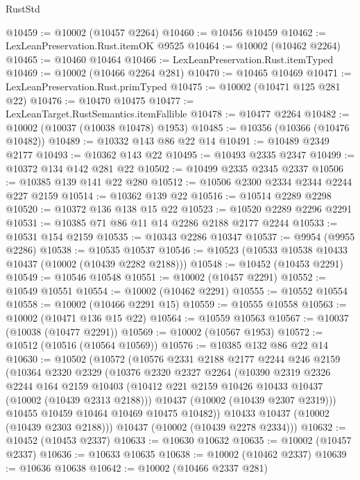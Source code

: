 \begin{lexlean}{RustStd}
\begin{coremodule}
@10459 := @10002 (@10457 @2264)
@10460 := @10456 @10459
@10462 := LexLeanPreservation.Rust.itemOK @9525
@10464 := @10002 (@10462 @2264)
@10465 := @10460 @10464
@10466 := LexLeanPreservation.Rust.itemTyped
@10469 := @10002 (@10466 @2264 @281)
@10470 := @10465 @10469
@10471 := LexLeanPreservation.Rust.primTyped
@10475 := @10002 (@10471 @125 @281 @22)
@10476 := @10470 @10475
@10477 := LexLeanTarget.RustSemantics.itemFallible
@10478 := @10477 @2264
@10482 := @10002 (@10037 (@10038 @10478) @1953)
@10485 := @10356 (@10366 (@10476 @10482))
@10489 := @10332 @143 @86 @22 @14
@10491 := @10489 @2349 @2177
@10493 := @10362 @143 @22
@10495 := @10493 @2335 @2347
@10499 := @10372 @134 @142 @281 @22
@10502 := @10499 @2335 @2345 @2337
@10506 := @10385 @139 @141 @22 @280
@10512 := @10506 @2300 @2334 @2344 @2244 @227 @2159
@10514 := @10362 @139 @22
@10516 := @10514 @2289 @2298
@10520 := @10372 @136 @138 @15 @22
@10523 := @10520 @2289 @2296 @2291
@10531 := @10385 @71 @86 @11 @14 @2286 @2188 @2177 @2244
@10533 := @10531 @154 @2159
@10535 := @10343 @2286 @10347
@10537 := @9954 (@9955 @2286)
@10538 := @10535 @10537
@10546 := @10523 (@10533 @10538 @10433 @10437 (@10002 (@10439 @2282 @2188)))
@10548 := @10452 (@10453 @2291)
@10549 := @10546 @10548
@10551 := @10002 (@10457 @2291)
@10552 := @10549 @10551
@10554 := @10002 (@10462 @2291)
@10555 := @10552 @10554
@10558 := @10002 (@10466 @2291 @15)
@10559 := @10555 @10558
@10563 := @10002 (@10471 @136 @15 @22)
@10564 := @10559 @10563
@10567 := @10037 (@10038 (@10477 @2291))
@10569 := @10002 (@10567 @1953)
@10572 := @10512 (@10516 (@10564 @10569))
@10576 := @10385 @132 @86 @22 @14
@10630 := @10502
    (@10572
      (@10576
        @2331
        @2188
        @2177
        @2244
        @246
        @2159
        (@10364
          @2320
          @2329
          (@10376
            @2320
            @2327
            @2264
            (@10390
              @2319
              @2326
              @2244
              @164
              @2159
              @10403
              (@10412 @221 @2159 @10426 @10433 @10437 (@10002 (@10439 @2313 @2188)))
              @10437
              (@10002 (@10439 @2307 @2319)))
            @10455
            @10459
            @10464
            @10469
            @10475
            @10482))
        @10433
        @10437
        (@10002 (@10439 @2303 @2188)))
      @10437
      (@10002 (@10439 @2278 @2334)))
@10632 := @10452 (@10453 @2337)
@10633 := @10630 @10632
@10635 := @10002 (@10457 @2337)
@10636 := @10633 @10635
@10638 := @10002 (@10462 @2337)
@10639 := @10636 @10638
@10642 := @10002 (@10466 @2337 @281)

\end{coremodule}
\end{lexlean}
